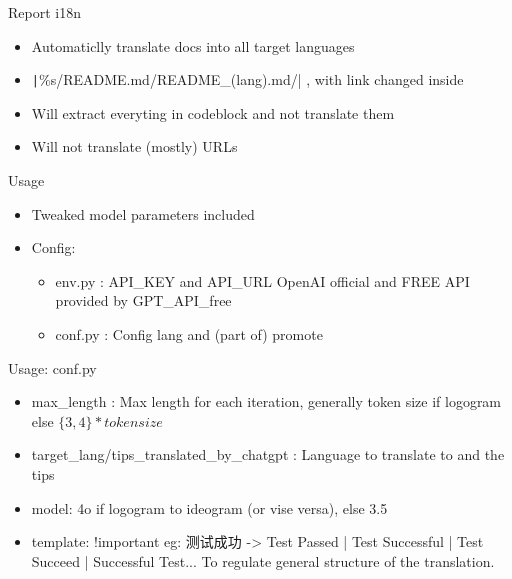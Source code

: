 \documentclass{beamer}
\begin{document}
\begin{frame}{Report i18n}
    \begin{itemize}
        \item Automaticlly translate docs into all target languages
        \item \texttt|\%s/README.md/README_(lang).md/| , with link changed inside
        \item Will extract everyting in codeblock and not translate them
        \item Will not translate (mostly) URLs
    \end{itemize}
\end{frame}

\begin{frame}{Usage}
    \begin{itemize}
        \item Tweaked model parameters included
        \item Config:
        \begin{itemize}
            \item env.py : API\_KEY and API\_URL 
            \newline OpenAI official and FREE API provided by GPT\_API\_free
            \item conf.py : Config lang and (part of) promote
        \end{itemize}
    \end{itemize}
\end{frame}

\begin{frame}{Usage: conf.py}
    \begin{itemize}
        \item max\_length : Max length for each iteration, generally token size if logogram else $\{3, 4\} * token size$
        \item target\_lang/tips\_translated\_by\_chatgpt : Language to translate to and the tips
        \item model: 4o if logogram to ideogram (or vise versa), else 3.5
        \item template: !important
        \newline eg: 测试成功 -> Test Passed | Test Successful | Test Succeed | Successful Test...
        \newline To regulate general structure of the translation.
    \end{itemize}
\end{frame}
\end{document}
